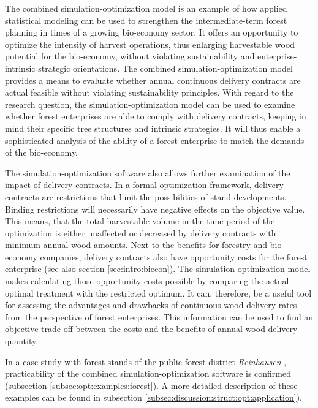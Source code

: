The combined simulation-optimization model is an example of how applied statistical modeling can be used to strengthen the intermediate-term forest planning in times of a growing bio-economy sector. It offers an opportunity to optimize the intensity of harvest operations, thus enlarging harvestable wood potential for the bio-economy, without violating sustainability and enterprise-intrinsic strategic orientations. The combined si\-mu\-la\-tion-op\-ti\-mi\-za\-tion model provides a means to evaluate whether annual continuous delivery contracts are actual feasible without violating sustainability principles. With regard to the research question, the si\-mu\-la\-tion-op\-ti\-mi\-za\-tion model can be used to examine whether forest enterprises are able to comply with delivery contracts, keeping in mind their specific tree structures and intrinsic strategies. It will thus enable a sophisticated analysis of the ability of a forest enterprise to match the demands of the bio-economy. 

The simulation-optimization software also allows further examination of the impact of delivery contracts. In a formal optimization framework, delivery contracts are restrictions that limit the possibilities of stand developments. Binding restrictions will necessarily have negative effects on the objective value. This means, that the total harvestable volume in the time period of the optimization is either unaffected or decreased by delivery contracts with minimum annual wood amounts. Next to the benefits for forestry and bio-economy companies, delivery contracts also have opportunity costs for the forest enterprise (see also section \ref{sec:intro:biecon}). The si\-mu\-la\-tion-op\-ti\-mi\-za\-tion model makes calculating those opportunity costs possible by comparing the actual optimal treatment with the restricted optimum. It can, therefore, be a useful tool for assessing the advantages and drawbacks of continuous wood delivery rates from the perspective of forest enterprises. This information can be used to find an objective trade-off between the costs and the benefits of annual wood delivery quantity.

In a case study with forest stands of the public forest district \textit{Reinhausen} \citep{nlf_2017}, practicability of the combined si\-mu\-la\-tion-op\-ti\-mi\-za\-tion software is confirmed (subsection \ref{subsec:opt:examples:forest}). A more detailed description of these examples can be found in subsection \ref{subsec:discussion:struct:opt:application}).